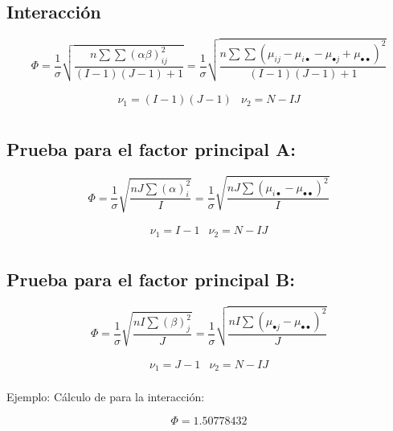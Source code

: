 \documentclass[]{book}
\theoremstyle{definition}
\theoremstyle{definition}
\theoremstyle{definition}
\theoremstyle{remark}
\begin{document}
\hypertarget{interaccion-2}{%
\subsection{Interacción}\label{interaccion-2}}

\[
\Phi = \frac{1}{\sigma}\sqrt{\frac{n\sum\sum\left(\alpha \beta \right)_{ij}^{2}}{\left( I - 1 \right)\left( J - 1 \right) + 1}} = \frac{1}{\sigma}\sqrt{\frac{n\sum\sum\left( \mu_{ij} - \mu_{i \bullet} - \mu_{\bullet j} + \mu_{\bullet \bullet} \right)^{2}}{\left( I - 1 \right)\left( J - 1 \right) + 1}}
\]

\[
\begin{matrix}
\nu_{1} = \left( I - 1 \right)\left( J - 1 \right) & \nu_{2} = N - IJ \\
\end{matrix}
\]

\hypertarget{prueba-para-el-factor-principal-a}{%
\subsection{Prueba para el factor principal
A:}\label{prueba-para-el-factor-principal-a}}

\[
\Phi = \frac{1}{\sigma}\sqrt{\frac{nJ\sum\left( \alpha \right)_{i}^{2}}{I}} = \frac{1}{\sigma}\sqrt{\frac{nJ\sum\left( \mu_{i \bullet} - \mu_{\bullet \bullet} \right)^{2}}{I}}
\]

\[
\begin{matrix}
\nu_{1} = I - 1 & \nu_{2} = N - IJ \\
\end{matrix}
\]

\hypertarget{prueba-para-el-factor-principal-b}{%
\subsection{Prueba para el factor principal
B:}\label{prueba-para-el-factor-principal-b}}

\[
\Phi = \frac{1}{\sigma}\sqrt{\frac{nI\sum\left( \beta \right)_{j}^{2}}{J}} = \frac{1}{\sigma}\sqrt{\frac{nI\sum\left( \mu_{\bullet j} - \mu_{\bullet \bullet} \right)^{2}}{J}}
\]

\[
\begin{matrix}
\nu_{1} = J - 1 & \nu_{2} = N - IJ \\
\end{matrix}
\]

Ejemplo: Cálculo de para la interacción:

\[
\Phi = 1.50778432
\]
\end{document}
